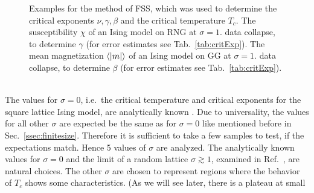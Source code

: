     \begin{figure}[htb]
        \centering
        \caption[Examples of Determining Critical Temperature and Exponents]
        {
            Examples for the method of FSS, which was used
            to determine the critical exponents \(\nu, \gamma, \beta\) and
            the critical temperature \(T_c\).
             The susceptibility \(\chi\)
                of an Ising model on RNG at \(\sigma=1\).
             data collapse, to determine \(\gamma\) (for error estimates see Tab.\ \ref{tab:critExp}).
             The mean magnetization \(\left< \left\vert m\right\vert \right>\)
                of an Ising model on GG at \(\sigma=1\).
             data collapse, to determine \(\beta\) (for error estimates see Tab.\ \ref{tab:critExp}).
        }
        \label{fig:gettingCrit2}
    \end{figure}\\
    The values for \(\sigma = 0\), i.e.\ the critical temperature and
    critical exponents for the square lattice Ising model,
    are analytically known \cite{Pelissetto2002}. Due to universality, the
    values for all other \(\sigma\) are expected be the same as for
    \(\sigma = 0\) like mentioned before in Sec.\ \ref{ssec:finitesize}.
    Therefore it is sufficient to take a few samples to test, if the
    expectations match. Hence 5 values of \(\sigma\) are analyzed.
    The analytically known values for \(\sigma = 0\) and the
    limit of a random lattice \(\sigma \gtrsim 1\), examined in
    Ref.\ \cite{Janke1994}, are natural choices.
    The other \(\sigma\) are chosen to represent regions where the behavior of
    \(T_c\) shows some characteristics. (As we will see later, there is a plateau at small
